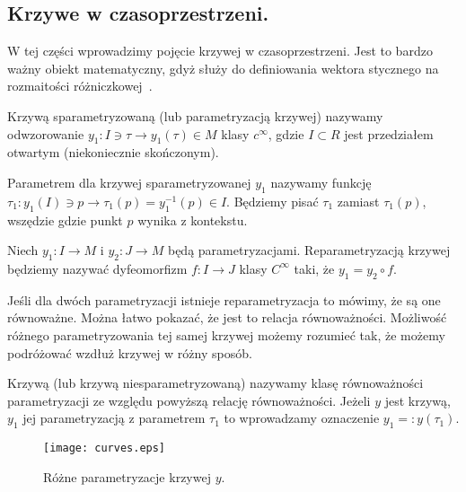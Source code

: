 \subsection{Krzywe w czasoprzestrzeni.}
W tej części wprowadzimy pojęcie krzywej w czasoprzestrzeni. 
Jest to bardzo ważny obiekt matematyczny, gdyż służy do definiowania
wektora stycznego na rozmaitości różniczkowej~\cite{ganca1987}.
\begin{definition}
Krzywą sparametryzowaną (lub parametryzacją krzywej) nazywamy 
odwzorowanie 
$ y_1 : I \ni \tau \to y_1(\tau) \in M$ klasy $c^\infty$, 
gdzie $I \subset R$ 
jest przedziałem otwartym (niekoniecznie skończonym).
\end{definition}
\begin{definition}
Parametrem dla krzywej sparametryzowanej $y_1$ 
nazywamy funkcję $ \tau_1: y_1(I) \ni p 
\to \tau_1(p) = y_1^{-1}( p )\in I$. 
Będziemy pisać
$\tau_1$ zamiast $\tau_1(p)$, wszędzie gdzie punkt $p$ 
wynika z kontekstu.
\end{definition}
\begin{definition}
Niech $y_1: I \to M$ i $y_2:J\to M$ będą parametryzacjami.
Reparametryzacją krzywej będziemy nazywać dyfeomorfizm $f : I \to J$
klasy $C^\infty$
taki, że $y_1 = y_2 \circ f$.
\end{definition}
Jeśli dla dwóch parametryzacji istnieje reparametryzacja to 
mówimy, że są one równoważne. Można łatwo pokazać, że jest to
relacja równoważności. Możliwość różnego parametryzowania tej 
samej krzywej możemy rozumieć tak, że możemy podróżować wzdłuż
krzywej w różny sposób.
\begin{definition}
Krzywą (lub krzywą niesparametryzowaną) nazywamy klasę równoważności
parametryzacji ze względu powyższą relację równoważności.
Jeżeli $y$ jest krzywą, $y_1$ jej parametryzacją z parametrem $\tau_1$
to wprowadzamy oznaczenie $y_1 =: y(\tau_1)$.
\end{definition}
\begin{figure}
\centering
\texttt{[image: curves.eps]}
\caption{Różne parametryzacje krzywej $y$.}
\end{figure}
